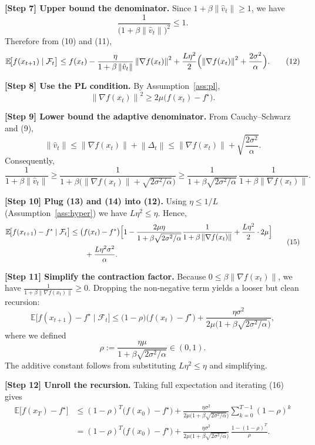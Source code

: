 \documentclass{article}
\newcommand{\E}{\mathbb{E}}
\newcommand{\norm}[1]{\left\lVert #1\right\rVert}
\begin{document}
\noindent\textbf{[Step 7] Upper bound the denominator.}  
Since $1+\beta\norm{\hat v_t}\ge 1$, we have
\[
\frac{1}{\bigl(1+\beta\norm{\hat v_t}\bigr)^2}\le 1 .
\]
Therefore from (10) and (11),
\[
\E\!\bigl[f(x_{t+1})\mid\mathcal{F}_t\bigr]
\le f(x_t)-\frac{\eta}{1+\beta\norm{\hat v_t}}\norm{\nabla f(x_t)}^2
+\frac{L\eta^2}{2}\Bigl(\norm{\nabla f(x_t)}^2+\frac{2\sigma^2}{\alpha}\Bigr). \tag{12}
\]

\noindent\textbf{[Step 8] Use the PL condition.}  
By Assumption~\ref{ass:pl},
\[
\norm{\nabla f(x_t)}^2 \ge 2\mu\bigl(f(x_t)-f^\star\bigr). \tag{13}
\]

\noindent\textbf{[Step 9] Lower bound the adaptive denominator.}  
From Cauchy–Schwarz and (9),
\[
\norm{\hat v_t}\le \norm{\nabla f(x_t)}+\norm{\Delta_t}
\le \norm{\nabla f(x_t)}+\sqrt{\frac{2\sigma^2}{\alpha}} .
\]
Consequently,
\[
\frac{1}{1+\beta\norm{\hat v_t}}
\ge \frac{1}{1+\beta\bigl(\norm{\nabla f(x_t)}+\sqrt{2\sigma^2/\alpha}\bigr)}
\ge \frac{1}{1+\beta\sqrt{2\sigma^2/\alpha}}\,\frac{1}{1+\beta\norm{\nabla f(x_t)}} .
\tag{14}
\]

\noindent\textbf{[Step 10] Plug (13) and (14) into (12).}  
Using $\eta\le 1/L$ (Assumption~\ref{ass:hyper}) we have $L\eta^2\le \eta$. Hence,
\[
\begin{aligned}
\E\!\bigl[f(x_{t+1})-f^\star\mid\mathcal{F}_t\bigr]
&\le \bigl(f(x_t)-f^\star\bigr)
\Bigl[1-\frac{2\mu\eta}{1+\beta\sqrt{2\sigma^2/\alpha}}\frac{1}{1+\beta\norm{\nabla f(x_t)}}+\frac{L\eta^2}{2}\cdot2\mu\Bigr] \\
&\qquad+\frac{L\eta^2\sigma^2}{\alpha}.
\end{aligned}
\tag{15}
\]

\noindent\textbf{[Step 11] Simplify the contraction factor.}  
Because $0\le\beta\norm{\nabla f(x_t)}$, we have $\frac{1}{1+\beta\norm{\nabla f(x_t)}}\ge 0$. Dropping the non‑negative term yields a looser but clean recursion:
\[
\E\!\bigl[f(x_{t+1})-f^\star\mid\mathcal{F}_t\bigr]
\le \bigl(1-\rho\bigr)\bigl(f(x_t)-f^\star\bigr)+\frac{\eta\sigma^2}{2\mu\bigl(1+\beta\sqrt{2\sigma^2/\alpha}\bigr)},
\tag{16}
\]
where we defined
\[
\rho:=\frac{\eta\mu}{1+\beta\sqrt{2\sigma^2/\alpha}}\in(0,1) .
\]
The additive constant follows from substituting $L\eta^2\le\eta$ and simplifying.

\noindent\textbf{[Step 12] Unroll the recursion.}  
Taking full expectation and iterating (16) gives
\[
\begin{aligned}
\E\!\bigl[f(x_T)-f^\star\bigr]
&\le (1-\rho)^T\bigl(f(x_0)-f^\star\bigr)
+\frac{\eta\sigma^2}{2\mu\bigl(1+\beta\sqrt{2\sigma^2/\alpha}\bigr)}
\sum_{k=0}^{T-1}(1-\rho)^k \\
&= (1-\rho)^T\bigl(f(x_0)-f^\star\bigr)
+\frac{\eta\sigma^2}{2\mu\bigl(1+\beta\sqrt{2\sigma^2/\alpha}\bigr)}\,
\frac{1-(1-\rho)^T}{\rho}.
\end{aligned}
\tag{17}
\]
\end{document}
